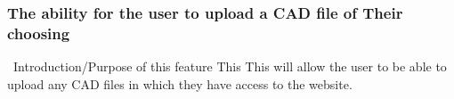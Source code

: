 \documentclass[letterpaper, 10pt, draftclsnofoot, onecolumn]{IEEEtran}
\begin{document}
{\begin{comment}
\paragraph[Input/Output sequence for this
feature]{\selectlanguage{english}\rmfamily\bfseries\color{black}
Input/Output sequence for this feature}
{\selectlanguage{english}\color{black} [ insert your text here ]}

\paragraph[Design constraints of this
feature]{\selectlanguage{english}\rmfamily\bfseries\color{black} Design
constraints of this feature}
{\selectlanguage{english}\color{black} [ insert your text here ]}

\paragraph[Performance requirements of this
feature]{\selectlanguage{english}\rmfamily\bfseries\color{black}
Performance requirements of this feature}
{\selectlanguage{english}\color{black} [ insert your text here ]}

\paragraph[Detailed functional requirements of this
feature]{\selectlanguage{english}\rmfamily\bfseries\color{black}
Detailed functional requirements of this feature}




\paragraph[]{\selectlanguage{english}\rmfamily\bfseries\color{black} }

\selectlanguage{english}\color{black} [ insert your text here ]\\\hline
\end{supertabular}
\end{flushleft}



\end{comment}



\bigskip

\subsubsection[{File upload}]{\rmfamily\bfseries\color{black}The ability for the user to upload a CAD file of Their choosing}
\vspace{5ex}
{\foreignlanguage{english}{\ }\foreignlanguage{english}{Introduction/Purpose
of this feature}}
{\color{black}
This This will allow the user to be able to upload any CAD files in which they have access to the website. }

}
\end{document}
